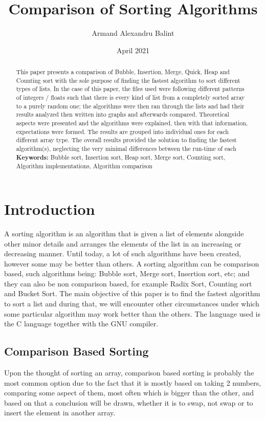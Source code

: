 \documentclass{article}
\title{Comparison of Sorting Algorithms}
\author{Armand Alexandru Balint\\}
\date{April 2021}
\begin{document}
\maketitle
\begin{abstract}
This paper presents a comparison of Bubble, Insertion, Merge, Quick, Heap and Counting sort with the sole purpose of finding the fastest algorithm to sort different types of lists. In the case of this paper, the files used were following different patterns of integers / floats such that there is every kind of list from a completely sorted array to a purely random one; the algorithms were then ran through the lists and had their results analyzed then written into graphs and afterwards compared. Theoretical aspects were presented and the algorithms were explained, then with that information, expectations were formed. The results are grouped into individual ones for each different array type. The overall results provided the solution to finding the fastest algorithm(s), neglecting the very minimal differences between the run-time of each \newline \newline \textbf{Keywords:} \footnotesize Bubble sort, Insertion sort, Heap sort, Merge sort, Counting sort, Algorithm implementations, Algorithm comparison


\end{abstract}
\normalsize
\pagebreak
\tableofcontents
\pagebreak

\section{Introduction}
A sorting algorithm is an algorithm that is given a list of elements alongside other minor details and arranges the elements of the list in an increasing or decreasing manner. Until today, a lot of such algorithms have been created, however some may be better than others. A sorting algorithm can be comparison based, such algorithms being: Bubble sort, Merge sort, Insertion sort, etc; and they can also be non comparison based, for example Radix Sort, Counting sort and Bucket Sort. The main objective of this paper is to find the fastest algorithm to sort a list and during that, we will encounter other circumstances under which some particular algorithm may work better than the others. The language used is the C language together with the GNU compiler.

\subsection{Comparison Based Sorting}
Upon the thought of sorting an array, comparison based sorting is probably the most common option due to the fact that it is mostly based on taking 2 numbers, comparing some aspect of them, most often which is bigger than the other, and based on that a conclusion will be drawn, whether it is to swap, not swap or to insert the element in another array.
\end{document}

